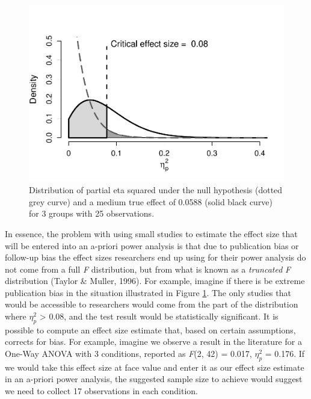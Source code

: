 \documentclass[
  english,
  ,jou, a4paper,floatsintext]{apa6}
\begin{document}
\begin{figure}
\centering
\includegraphics{sample_size_justification_files/figure-latex/follow-up-bias-1.pdf}
\caption{\label{fig:follow-up-bias}Distribution of partial eta squared under the null hypothesis (dotted grey curve) and a medium true effect of 0.0588 (solid black curve) for 3 groups with 25 observations.}
\end{figure}

In essence, the problem with using small studies to estimate the effect size that will be entered into an a-priori power analysis is that due to publication bias or follow-up bias the effect sizes researchers end up using for their power analysis do not come from a full \emph{F} distribution, but from what is known as a \emph{truncated} \emph{F} distribution (Taylor \& Muller, 1996). For example, imagine if there is be extreme publication bias in the situation illustrated in Figure \ref{fig:follow-up-bias}. The only studies that would be accessible to researchers would come from the part of the distribution where \(\eta_p^2\) \textgreater{} 0.08, and the test result would be statistically significant. It is possible to compute an effect size estimate that, based on certain assumptions, corrects for bias. For example, imagine we observe a result in the literature for a One-Way ANOVA with 3 conditions, reported as \emph{F}(2, 42) = 0.017, \(\eta_p^2\) = 0.176. If we would take this effect size at face value and enter it as our effect size estimate in an a-priori power analysis, the suggested sample size to achieve would suggest we need to collect 17 observations in each condition.
\end{document}
